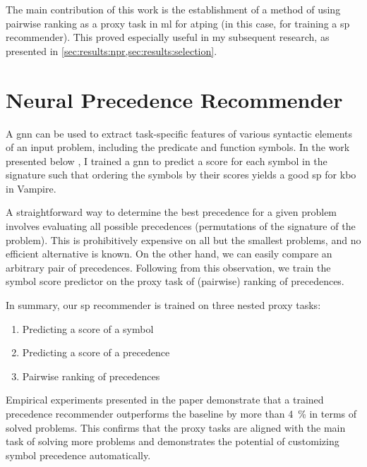 The main contribution of this work is the establishment of a method of using pairwise ranking as a proxy task in \gls{ml} for \gls{atping} (in this case, for training a \gls{sp} recommender).
This proved especially useful in my subsequent research,
as presented in \cref{sec:results:npr,sec:results:selection}.


\section{Neural Precedence Recommender}
\label{sec:results:npr}


A \gls{gnn} can be used to extract task-specific features of various syntactic elements of an input problem,
including the predicate and function symbols.
In the work presented below \cite{DBLP:conf/cade/Bartek021},
I trained a \gls{gnn} to predict a score for each symbol in the signature such that ordering the symbols by their scores yields a good \gls{sp} for \gls{kbo} in Vampire.


A straightforward way to determine the best precedence for a given problem involves evaluating all possible precedences (permutations of the signature of the problem).
This is prohibitively expensive on all but the smallest problems, and no efficient alternative is known.
On the other hand, we can easily compare an arbitrary pair of precedences.
Following from this observation, we train the symbol score predictor on the proxy task of (pairwise) ranking of precedences.

In summary, our \gls{sp} recommender is trained on three nested proxy tasks:
\begin{enumerate}
\item Predicting a score of a symbol
\item Predicting a score of a precedence
\item Pairwise ranking of precedences
\end{enumerate}

Empirical experiments presented in the paper demonstrate that a trained precedence recommender outperforms the baseline by more than \SI{4}{\percent} in terms of solved problems.
This confirms that the proxy tasks are aligned with the main task of solving more problems and demonstrates the potential of customizing symbol precedence automatically.

